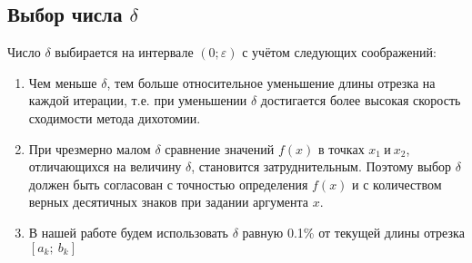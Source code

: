 \documentclass{article}
\begin{document}
\subsection{Выбор числа $\delta$}
\noindent Число $\delta$ выбирается на интервале $(0;\varepsilon)$ с учётом следующих соображений:
\begin{enumerate}
    \item Чем меньше $\delta$, тем больше относительное уменьшение длины отрезка на каждой итерации, т.е. при уменьшении $\delta$ достигается более высокая скорость сходимости метода дихотомии.
    \item При чрезмерно малом $\delta$ сравнение значений $f(x)$ в точках $x_1~и~x_2$, отличающихся на величину $\delta$, становится затруднительным. Поэтому выбор $\delta$ должен быть согласован с точностью определения $f(x)$ и с количеством верных десятичных знаков при задании аргумента $x$.
    \item В нашей работе будем использовать $\delta$ равную 0.1\% от текущей длины отрезка $[a_k;~b_k]$
\end{enumerate}
\end{document}
